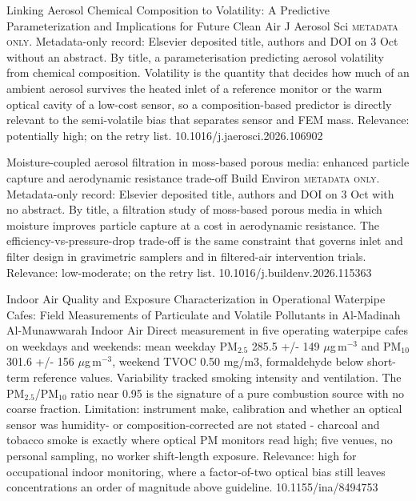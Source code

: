 \documentclass[10pt]{article}
\begin{document}
{Linking Aerosol Chemical Composition to Volatility: A Predictive Parameterization and Implications for Future Clean Air}
{J Aerosol Sci}
{\textsc{metadata only.} Metadata-only record: Elsevier deposited title, authors and DOI on 3 Oct without an abstract. By title, a parameterisation predicting aerosol volatility from chemical composition. Volatility is the quantity that decides how much of an ambient aerosol survives the heated inlet of a reference monitor or the warm optical cavity of a low-cost sensor, so a composition-based predictor is directly relevant to the semi-volatile bias that separates sensor and FEM mass. Relevance: potentially high; on the retry list.}
{10.1016/j.jaerosci.2026.106902}

{Moisture-coupled aerosol filtration in moss-based porous media: enhanced particle capture and aerodynamic resistance trade-off}
{Build Environ}
{\textsc{metadata only.} Metadata-only record: Elsevier deposited title, authors and DOI on 3 Oct with no abstract. By title, a filtration study of moss-based porous media in which moisture improves particle capture at a cost in aerodynamic resistance. The efficiency-vs-pressure-drop trade-off is the same constraint that governs inlet and filter design in gravimetric samplers and in filtered-air intervention trials. Relevance: low-moderate; on the retry list.}
{10.1016/j.buildenv.2026.115363}

\par{}\baselineskip{}\baselineskip
{}

{Indoor Air Quality and Exposure Characterization in Operational Waterpipe Cafes: Field Measurements of Particulate and Volatile Pollutants in Al-Madinah Al-Munawwarah}
{Indoor Air}
{Direct measurement in five operating waterpipe cafes on weekdays and weekends: mean weekday PM$_{2.5}$ 285.5 +/- 149 $\mu$g\,m$^{-3}$ and PM$_{10}$ 301.6 +/- 156 $\mu$g\,m$^{-3}$, weekend TVOC 0.50 mg/m3, formaldehyde below short-term reference values. Variability tracked smoking intensity and ventilation. The PM$_{2.5}$/PM$_{10}$ ratio near 0.95 is the signature of a pure combustion source with no coarse fraction. Limitation: instrument make, calibration and whether an optical sensor was humidity- or composition-corrected are not stated - charcoal and tobacco smoke is exactly where optical PM monitors read high; five venues, no personal sampling, no worker shift-length exposure. Relevance: high for occupational indoor monitoring, where a factor-of-two optical bias still leaves concentrations an order of magnitude above guideline.}
{10.1155/ina/8494753}
\end{document}
